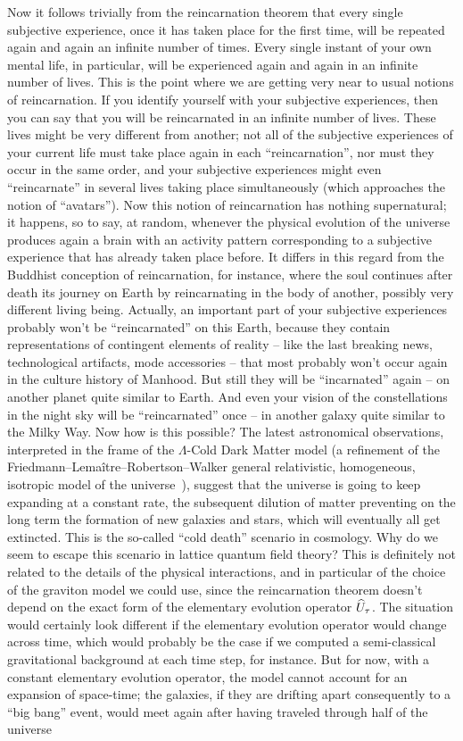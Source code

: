 Now it follows trivially from the reincarnation theorem that every single subjective experience, once it has taken place for the first time, will be repeated again and again an infinite number of times. Every single instant of your own mental life, in particular, will be experienced again and again in an infinite number of lives. This is the point where we are getting very near to usual notions of reincarnation. If you identify yourself with your subjective experiences, then you can say that you will be reincarnated in an infinite number of lives. These lives might be very different from another; not all of the subjective experiences of your current life must take place again in each ``reincarnation'', nor must they occur in the same order, and your subjective experiences might even ``reincarnate'' in several lives taking place simultaneously (which approaches the notion of ``avatars''). Now this notion of reincarnation has nothing supernatural; it happens, so to say, at random, whenever the physical evolution of the universe produces again a brain with an activity pattern corresponding to a subjective experience that has already taken place before. It differs in this regard from the Buddhist conception of reincarnation, for instance, where the soul continues after death its journey on Earth by reincarnating in the body of another, possibly very different living being. Actually, an important part of your subjective experiences probably won't be ``reincarnated'' on this Earth, because they contain representations of contingent elements of reality -- like the last breaking news, technological artifacts, mode accessories -- that most probably won't occur again in the culture history of Manhood. But still they will be ``incarnated'' again -- on another planet quite similar to Earth. And even your vision of the constellations in the night sky will be ``reincarnated'' once -- in another galaxy quite similar to the Milky Way. Now how is this possible? The latest astronomical observations, interpreted in the frame of the  $\Lambda$-Cold Dark Matter model (a refinement of the Friedmann–Lemaître–Robertson–Walker general relativistic, homogeneous, isotropic model of the universe~\cite{Friedman1922}), suggest that the universe is going to keep expanding at a constant rate, the subsequent dilution of matter preventing on the long term the formation of new galaxies and stars, which will eventually all get extincted. This is the so-called ``cold death'' scenario in cosmology. Why do we seem to escape this scenario in lattice quantum field theory? This is definitely not related to the details of the physical interactions, and in particular of the choice of the graviton model we could use, since the reincarnation theorem doesn't depend on the exact form of the elementary evolution operator $\widehat{U}_\tau$. The situation would certainly look different if the elementary evolution operator would change across time, which would probably be the case if we computed a semi-classical gravitational background at each time step, for instance. But for now, with a constant elementary evolution operator, the model cannot account for an expansion of space-time; the galaxies, if they are drifting apart consequently to a ``big bang'' event, would meet again after having traveled through half of the universe 